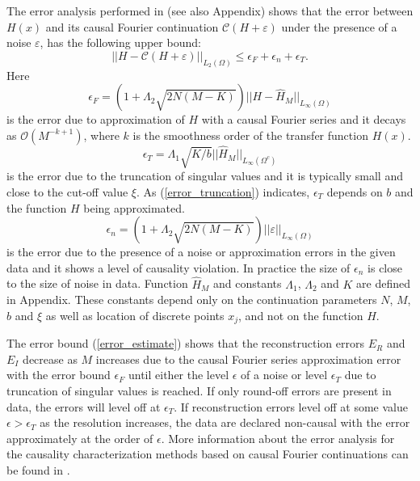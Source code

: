 \documentclass[journal,twoside]{IEEEtran}
\begin{document}
The error analysis performed in \cite{Barannyk_Aboutaleb_Elshabini_Barlow_IEEE} (see also Appendix) shows that the error between $H(x)$ and its causal Fourier continuation $ {\mathcal C}(H+\varepsilon) $ under the presence of a noise $\varepsilon$, has the following upper bound:
\begin{equation} \label{error_estimate}
||H- {\mathcal C}(H+\varepsilon) ||_{L_2(\Omega)} \leq \epsilon_F+\epsilon_n + \epsilon_T.
\end{equation}
Here
\begin{equation}\label{error_Fourier}
\epsilon_F= (1+\Lambda_2 \sqrt{2N(M-K)}) || H-\hat H_{M} || _{L_\infty(\Omega)} 
\end{equation}
is the error due to approximation of $H$ with a causal Fourier series and it decays as ${\mathcal O}(M^{-k+1})$, where $k$ is the smoothness order of the transfer function $H(x)$.
\begin{equation}\label{error_truncation}
\epsilon_T=\Lambda_1 \sqrt{K/b} ||\hat H_{M}||_{L_\infty(\Omega^c)}
\end{equation} 
is the error due to the truncation of singular values and it is typically small and close to the cut-off value $\xi$. 
As (\ref{error_truncation}) indicates, $\epsilon_T$ depends on $b$ and the function $H$ being approximated. 
\begin{equation}\label{error_noise}
\epsilon_n=(1+\Lambda_2 \sqrt{2N(M-K)}) ||\varepsilon||_{L_\infty(\Omega)} 
\end{equation} 
is the error due to the presence of a noise or approximation errors in the given data and it shows a level of causality violation. In practice the size of $\epsilon_n$ is close to the size of noise in data. Function $\hat H_{M}$ and  constants  $\Lambda_1$,  $\Lambda_2$  and $K$ are defined in Appendix. These constants depend only on the continuation parameters $N$, $M$, $b$ and $\xi$ as well as location of discrete points $x_j$, and not on the function $H$. 

The error bound (\ref{error_estimate}) shows that the reconstruction errors $E_R$ and $E_I$ decrease as $M$ increases due to the causal Fourier series approximation error with the error bound $\epsilon_F$ 
 until either the level $\epsilon$ of a noise or level $\epsilon_T$ due to truncation of singular values is reached. If only round-off errors are present in data, the errors will level off at $\epsilon_T$. If reconstruction errors level off at some value $\epsilon>\epsilon_T$ as the resolution increases, the data are declared non-causal with the error approximately at the order of $\epsilon$. More information about the error analysis for the causality characterization methods based on causal Fourier continuations can be found in \cite{Barannyk_Aboutaleb_Elshabini_Barlow_IEEE}. 
\end{document}

